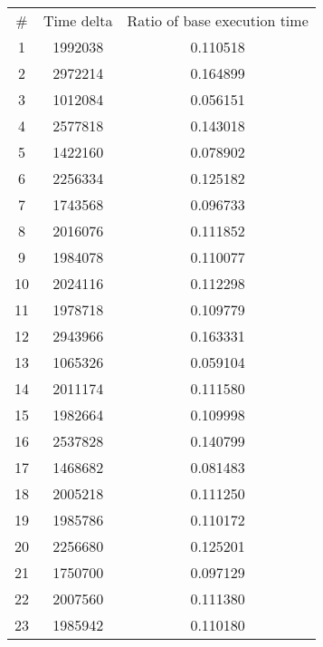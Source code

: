 \begin{tabular}{ccc}
\# & Time delta & Ratio of base execution time\\
1 & 1992038 & 0.110518 \\
2 & 2972214 & 0.164899 \\
3 & 1012084 & 0.056151 \\
4 & 2577818 & 0.143018 \\
5 & 1422160 & 0.078902 \\
6 & 2256334 & 0.125182 \\
7 & 1743568 & 0.096733 \\
8 & 2016076 & 0.111852 \\
9 & 1984078 & 0.110077 \\
10 & 2024116 & 0.112298 \\
11 & 1978718 & 0.109779 \\
12 & 2943966 & 0.163331 \\
13 & 1065326 & 0.059104 \\
14 & 2011174 & 0.111580 \\
15 & 1982664 & 0.109998 \\
16 & 2537828 & 0.140799 \\
17 & 1468682 & 0.081483 \\
18 & 2005218 & 0.111250 \\
19 & 1985786 & 0.110172 \\
20 & 2256680 & 0.125201 \\
21 & 1750700 & 0.097129 \\
22 & 2007560 & 0.111380 \\
23 & 1985942 & 0.110180 \\
\end{tabular}
